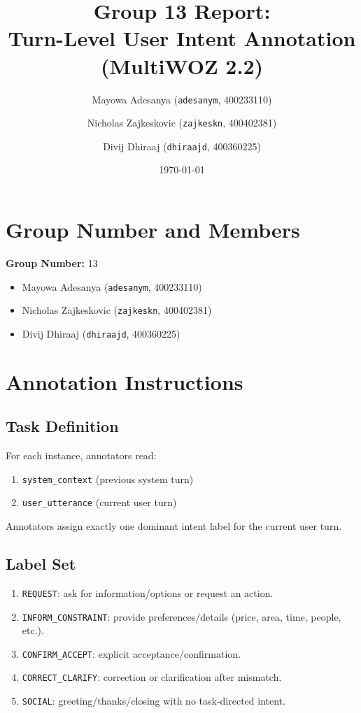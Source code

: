 \documentclass[11pt]{article}
\title{Group 13 Report:\\Turn-Level User Intent Annotation (MultiWOZ 2.2)}
\author{
  Mayowa Adesanya (\texttt{adesanym}, 400233110) \and
  Nicholas Zajkeskovic (\texttt{zajkeskn}, 400402381) \and
  Divij Dhiraaj (\texttt{dhiraajd}, 400360225)
}
\date{\today}
\begin{document}
\maketitle

\section{Group Number and Members}
\textbf{Group Number:} 13
\begin{itemize}
  \item Mayowa Adesanya (\texttt{adesanym}, 400233110)
  \item Nicholas Zajkeskovic (\texttt{zajkeskn}, 400402381)
  \item Divij Dhiraaj (\texttt{dhiraajd}, 400360225)
\end{itemize}

\section{Annotation Instructions}
\subsection{Task Definition}
For each instance, annotators read:
\begin{enumerate}
  \item \texttt{system\_context} (previous system turn)
  \item \texttt{user\_utterance} (current user turn)
\end{enumerate}
Annotators assign exactly one dominant intent label for the current user turn.

\subsection{Label Set}
\begin{enumerate}
  \item \texttt{REQUEST}: ask for information/options or request an action.
  \item \texttt{INFORM\_CONSTRAINT}: provide preferences/details (price, area, time, people, etc.).
  \item \texttt{CONFIRM\_ACCEPT}: explicit acceptance/confirmation.
  \item \texttt{CORRECT\_CLARIFY}: correction or clarification after mismatch.
  \item \texttt{SOCIAL}: greeting/thanks/closing with no task-directed intent.
\end{enumerate}
\end{document}
